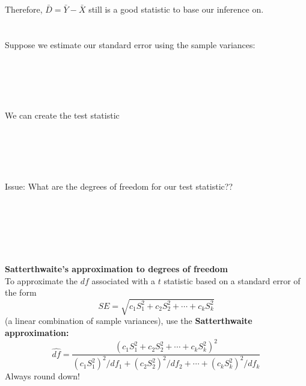 Therefore, $\bar{D}=\bar{Y}-\bar{X}$ still is a good statistic to base our inference on.\\~\\~\\
Suppose we estimate our standard error using the sample variances:\\~\\~\\~\\~\\~\\

We can create the test statistic\\~\\~\\~\\~\\~\\
Issue:  What are the degrees of freedom for our test statistic??\\~\\~\\~\\~\\~\\~\\

\textbf{Satterthwaite's approximation to degrees of freedom}\\
To approximate the $df$ associated with a $t$ statistic based on a standard error of the form
$$ SE = \sqrt{c_1 S^2_1 + c_2 S^2_2 + \cdots + c_k S^2_k}$$
(a linear combination of sample variances), use the \textbf{Satterthwaite approximation:}
$$ \widehat{df} = \frac{(c_1 S^2_1 + c_2 S^2_2 + \cdots + c_k S^2_k)^2}{(c_1 S^2_1)^2/df_1 + (c_2 S^2_2)^2/df_2 + \cdots + (c_k S^2_k)^2/df_k}$$
Always round down!
\newpage

